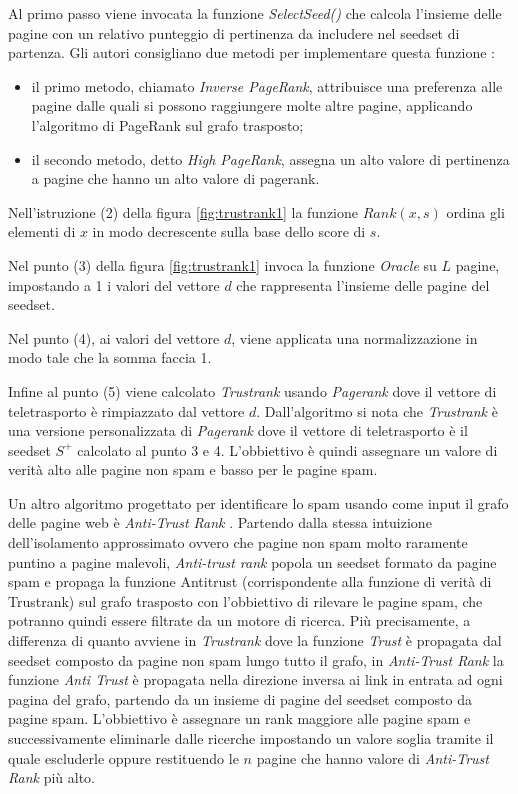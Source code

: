 Al primo passo viene invocata la funzione \textit{SelectSeed()} che calcola l'insieme delle pagine con un relativo punteggio di pertinenza da includere nel seedset di partenza. Gli autori consigliano due metodi per implementare questa funzione : 
\begin{itemize}
 \item il primo metodo, chiamato \textit{Inverse PageRank}, attribuisce una preferenza alle pagine dalle quali si possono raggiungere molte altre pagine,  applicando l'algoritmo di PageRank sul grafo trasposto;
\item il secondo metodo, detto \textit{High PageRank}, assegna un alto valore di pertinenza a pagine che hanno un alto valore di pagerank.
\end{itemize}

Nell'istruzione (2) della figura \ref{fig:trustrank1} la funzione \(Rank(x,s)\) ordina gli elementi di \(x\) in modo decrescente sulla base dello score di \(s\). 

Nel punto (3) della figura \ref{fig:trustrank1} invoca la funzione \textit{Oracle} su \(L\) pagine, impostando a 1 i valori del vettore \(d\) che rappresenta l'insieme delle pagine del seedset.

Nel punto (4), ai valori del vettore \(d\), viene applicata una normalizzazione in modo tale che la somma faccia 1. 

Infine al punto (5) viene calcolato \textit{Trustrank} usando \textit{Pagerank} dove il vettore di teletrasporto è rimpiazzato dal vettore \(d\). Dall'algoritmo si nota che \textit{Trustrank} è una versione personalizzata di \textit{Pagerank} dove il vettore di teletrasporto è il seedset \(S^+\) calcolato al punto 3 e 4. L'obbiettivo è quindi assegnare un valore di verità alto alle pagine non spam e basso per le pagine spam.


Un altro algoritmo progettato per identificare lo spam usando come input il grafo delle pagine web è \textit{Anti-Trust Rank} \cite{Krishnan06webspam}. Partendo dalla stessa intuizione dell'isolamento approssimato ovvero che pagine non spam molto raramente puntino a pagine malevoli, \textit{Anti-trust rank}  popola un seedset formato da pagine spam e propaga la funzione Antitrust (corrispondente alla funzione di verità di Trustrank) sul grafo trasposto con l’obbiettivo di rilevare le pagine spam, che potranno quindi essere filtrate da un motore di ricerca. Più precisamente, a differenza di quanto avviene in \textit{Trustrank} dove la funzione \textit{Trust} è propagata dal seedset composto da pagine non spam lungo tutto il grafo, in \textit{Anti-Trust Rank} la funzione \textit{Anti Trust} è propagata nella direzione inversa ai link in entrata ad ogni pagina del grafo, partendo da un insieme di pagine del seedset composto da pagine spam. L'obbiettivo è assegnare un rank maggiore alle pagine spam e 
successivamente eliminarle dalle ricerche impostando un valore soglia tramite il quale escluderle oppure restituendo le \(n\) pagine che hanno valore di \textit{Anti-Trust Rank} più alto.
 
